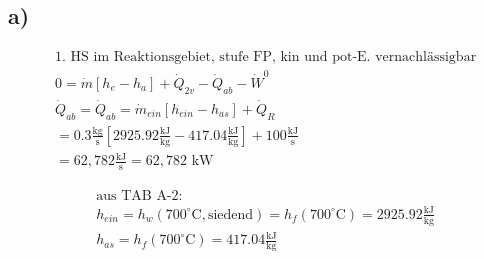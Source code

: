 

\subsection*{a)}
\begin{align*}
&\text{1. HS im Reaktionsgebiet, stufe FP, kin und pot-E. vernachlässigbar} \\
&0 = \dot{m} \left[ h_e - h_a \right] + \dot{Q}_{2v} - \dot{Q}_{ab} - \dot{W}^0 \\
&\dot{Q}_{ab} = \dot{Q}_{ab} = \dot{m}_{ein} \left[ h_{ein} - h_{as} \right] + \dot{Q}_R \\
&= 0.3 \frac{\text{kg}}{\text{s}} \left[ 2925.92 \frac{\text{kJ}}{\text{kg}} - 417.04 \frac{\text{kJ}}{\text{kg}} \right] + 100 \frac{\text{kJ}}{\text{s}} \\
&= 62,782 \frac{\text{kJ}}{\text{s}} = 62,782 \text{ kW}
\end{align*}

\begin{align*}
&\text{aus TAB A-2:} \\
&h_{ein} = h_w (700^\circ \text{C}, \text{siedend}) = h_f (700^\circ \text{C}) = 2925.92 \frac{\text{kJ}}{\text{kg}} \\
&h_{as} = h_f (700^\circ \text{C}) = 417.04 \frac{\text{kJ}}{\text{kg}}
\end{align*}